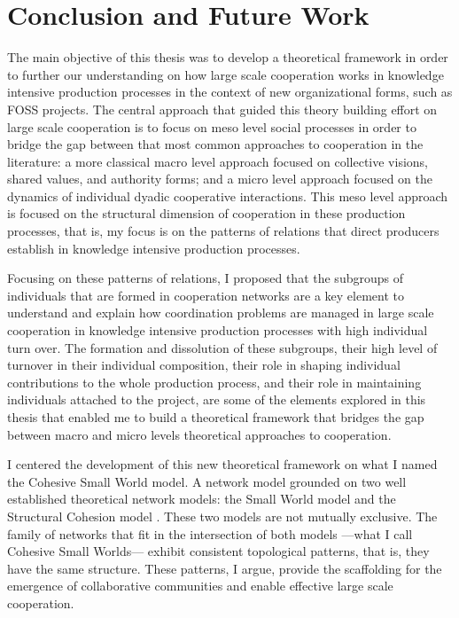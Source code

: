 \chapter{Conclusion and Future Work}
\label{conclusion}

The main objective of this thesis was to develop a theoretical framework in order to further our understanding on how large scale cooperation works in knowledge intensive production processes in the context of new organizational forms, such as FOSS projects. The central approach that guided this theory building effort on large scale cooperation is to focus on meso level social processes in order to bridge the gap between that most common approaches to cooperation in the literature: a more classical macro level approach focused on collective visions, shared values, and authority forms; and a micro level approach focused on the dynamics of individual dyadic cooperative interactions. This meso level approach is focused on the structural dimension of cooperation in these production processes, that is, my focus is on the patterns of relations that direct producers establish in knowledge intensive production processes.

Focusing on these patterns of relations, I proposed that the subgroups of individuals that are formed in cooperation networks are a key element to understand and explain how coordination problems are managed in large scale cooperation in knowledge intensive production processes with high individual turn over. The formation and dissolution of these subgroups, their high level of turnover in their individual composition, their role in shaping individual contributions to the whole production process, and their role in maintaining individuals attached to the project, are some of the elements explored in this thesis that enabled me to build a theoretical framework that bridges the gap between macro and micro levels theoretical approaches to cooperation.

I centered the development of this new theoretical framework on what I named the Cohesive Small World model. A network model grounded on two well established theoretical network models: the Small World model \citep{watts:1998} and the Structural Cohesion model \citep{white:2001, moody:2003}. These two models are not mutually exclusive. The family of networks that fit in the intersection of both models ---what I call Cohesive Small Worlds--- exhibit consistent topological patterns, that is, they have the same structure. These patterns, I argue, provide the scaffolding for the emergence of collaborative communities \citep{adler:2006} and enable effective large scale cooperation.

